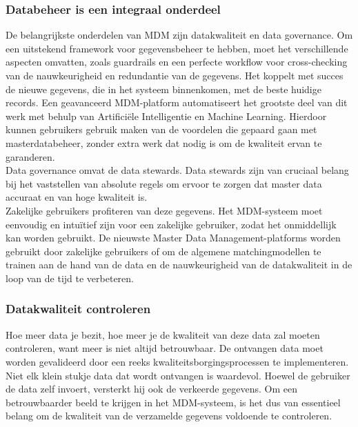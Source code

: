 \subsubsection{Databeheer is een integraal onderdeel}
De belangrijkste onderdelen van MDM zijn datakwaliteit en data governance. Om een uitstekend framework voor gegevensbeheer te hebben, moet het verschillende aspecten omvatten, zoals guardrails en een perfecte workflow voor cross-checking van de nauwkeurigheid en redundantie van de gegevens. Het koppelt met succes de nieuwe gegevens, die in het systeem binnenkomen, met de beste huidige records. Een geavanceerd MDM-platform automatiseert het grootste deel van dit werk met behulp van Artificiële Intelligentie en Machine Learning. Hierdoor kunnen gebruikers gebruik maken van de voordelen die gepaard gaan met masterdatabeheer, zonder extra werk dat nodig is om de kwaliteit ervan te garanderen. 
\\Data governance omvat de data stewards. Data stewards zijn van cruciaal belang bij het vaststellen van absolute regels om ervoor te zorgen dat master data accuraat en van hoge kwaliteit is. 
\\Zakelijke gebruikers profiteren van deze gegevens. Het MDM-systeem moet eenvoudig en intuïtief zijn voor een zakelijke gebruiker, zodat het onmiddellijk kan worden gebruikt. De nieuwste Master Data Management-platforms worden gebruikt door zakelijke gebruikers of om de algemene matchingmodellen te trainen aan de hand van de data en de nauwkeurigheid van de datakwaliteit in de loop van de tijd te verbeteren.

\subsubsection{Datakwaliteit controleren}
Hoe meer data je bezit, hoe meer je de kwaliteit van deze data zal moeten controleren, want meer is niet altijd betrouwbaar. De ontvangen data moet worden gevalideerd door een reeks kwaliteitsborgingsprocessen te implementeren. Niet elk klein stukje data dat wordt ontvangen is waardevol. Hoewel de gebruiker de data zelf invoert, versterkt hij ook de verkeerde gegevens. Om een betrouwbaarder beeld te krijgen in het MDM-systeem, is het dus van essentieel belang om de kwaliteit van de verzamelde gegevens voldoende te controleren. 

